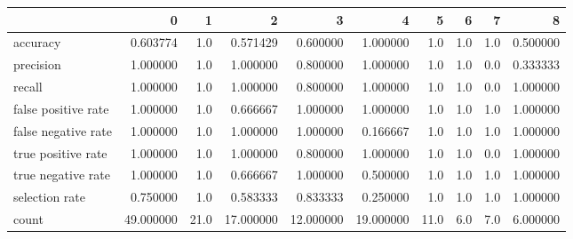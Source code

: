 \begin{tabular}{lrrrrrrrrr}
\toprule
{} &          0 &     1 &          2 &          3 &          4 &     5 &    6 &    7 &         8 \\
\midrule
accuracy            &   0.603774 &   1.0 &   0.571429 &   0.600000 &   1.000000 &   1.0 &  1.0 &  1.0 &  0.500000 \\
precision           &   1.000000 &   1.0 &   1.000000 &   0.800000 &   1.000000 &   1.0 &  1.0 &  0.0 &  0.333333 \\
recall              &   1.000000 &   1.0 &   1.000000 &   0.800000 &   1.000000 &   1.0 &  1.0 &  0.0 &  1.000000 \\
false positive rate &   1.000000 &   1.0 &   0.666667 &   1.000000 &   1.000000 &   1.0 &  1.0 &  1.0 &  1.000000 \\
false negative rate &   1.000000 &   1.0 &   1.000000 &   1.000000 &   0.166667 &   1.0 &  1.0 &  1.0 &  1.000000 \\
true positive rate  &   1.000000 &   1.0 &   1.000000 &   0.800000 &   1.000000 &   1.0 &  1.0 &  0.0 &  1.000000 \\
true negative rate  &   1.000000 &   1.0 &   0.666667 &   1.000000 &   0.500000 &   1.0 &  1.0 &  1.0 &  1.000000 \\
selection rate      &   0.750000 &   1.0 &   0.583333 &   0.833333 &   0.250000 &   1.0 &  1.0 &  1.0 &  1.000000 \\
count               &  49.000000 &  21.0 &  17.000000 &  12.000000 &  19.000000 &  11.0 &  6.0 &  7.0 &  6.000000 \\
\bottomrule
\end{tabular}
